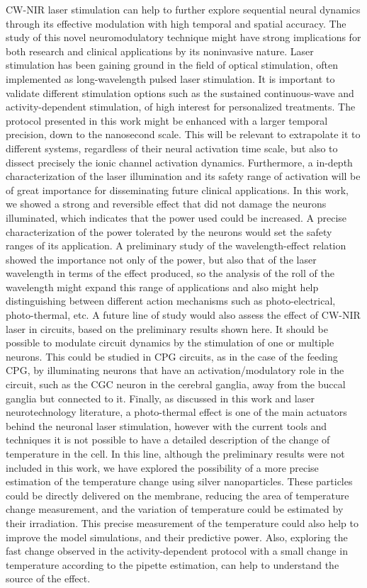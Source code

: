CW-NIR laser stimulation can help to further explore sequential neural dynamics through its effective modulation with high temporal and spatial accuracy. The study of this novel neuromodulatory technique might have strong implications for both research and clinical applications by its noninvasive nature. Laser stimulation has been gaining ground in the field of optical stimulation, often implemented as long-wavelength pulsed laser stimulation. It is important to validate different stimulation options such as the sustained continuous-wave and activity-dependent stimulation, of high interest for personalized treatments. The protocol presented in this work might be enhanced with a larger temporal precision, down to the nanosecond scale. This will be relevant to extrapolate it to different systems, regardless of their neural activation time scale, but also to dissect precisely the ionic channel activation dynamics. Furthermore, a in-depth characterization of the laser illumination and its safety range of activation will be of great importance for disseminating future clinical applications. In this work, we showed a strong and reversible effect that did not damage the neurons illuminated, which indicates that the power used could be increased. A precise characterization of the power tolerated by the neurons would set the safety ranges of its application. A preliminary study of the wavelength-effect relation showed the importance not only of the power, but also that of the laser wavelength in terms of the effect produced, so the analysis of the roll of the wavelength might expand this range of applications and also might help distinguishing between different action mechanisms such as photo-electrical, photo-thermal, etc. A future line of study would also assess the effect of CW-NIR laser in circuits, based on the preliminary results shown here. It should be possible to modulate circuit dynamics by the stimulation of one or multiple neurons. This could be studied in CPG circuits, as in the case of the feeding CPG, by illuminating neurons that have an activation/modulatory role in the circuit, such as the CGC neuron in the cerebral ganglia, away from the buccal ganglia but connected to it. Finally, as discussed in this work and laser neurotechnology literature, a photo-thermal effect is one of the main actuators behind the neuronal laser stimulation, however with the current tools and techniques it is not possible to have a detailed description of the change of temperature in the cell. In this line, although the preliminary results were not included in this work, we have explored the possibility of a more precise estimation of the temperature change using silver nanoparticles. These particles could be directly delivered on the membrane, reducing the area of temperature change measurement, and the variation of temperature could be estimated by their irradiation. This precise measurement of the temperature could also help to improve the model simulations, and their predictive power. Also, exploring the fast change observed in the activity-dependent protocol with a small change in temperature according to the pipette estimation, can help to understand the source of the effect.

